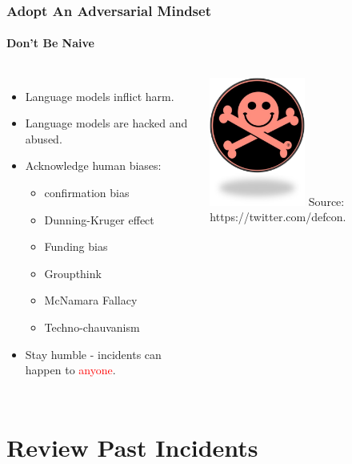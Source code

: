 \documentclass[11pt,
               aspectratio=169,
               hyperref={colorlinks}
               ]{beamer}
\begin{document}
		\begin{frame}
			
			\frametitle{Adopt An Adversarial Mindset}
			\framesubtitle{Don't Be Naive}
			
			\begin{columns}
				\vspace{-5pt}
				\begin{itemize}
					\item Language models inflict harm.				
					\item Language models are hacked and abused.		
					\item Acknowledge human biases:
						\begin{itemize}
							\item confirmation bias
							\item Dunning-Kruger effect
							\item Funding bias
							\item Groupthink
							\item McNamara Fallacy
							\item Techno-chauvanism
						\end{itemize}
					\item Stay humble - incidents can happen to \textcolor{red}{anyone}.
				\end{itemize}
				\centering
				\includegraphics[height=120pt]{../img/defcon.jpg}
				\newline
				\small{Source: https://twitter.com/defcon.}
			\end{columns}
					
		\end{frame}
		

	\section{Review Past Incidents}
\end{document}

